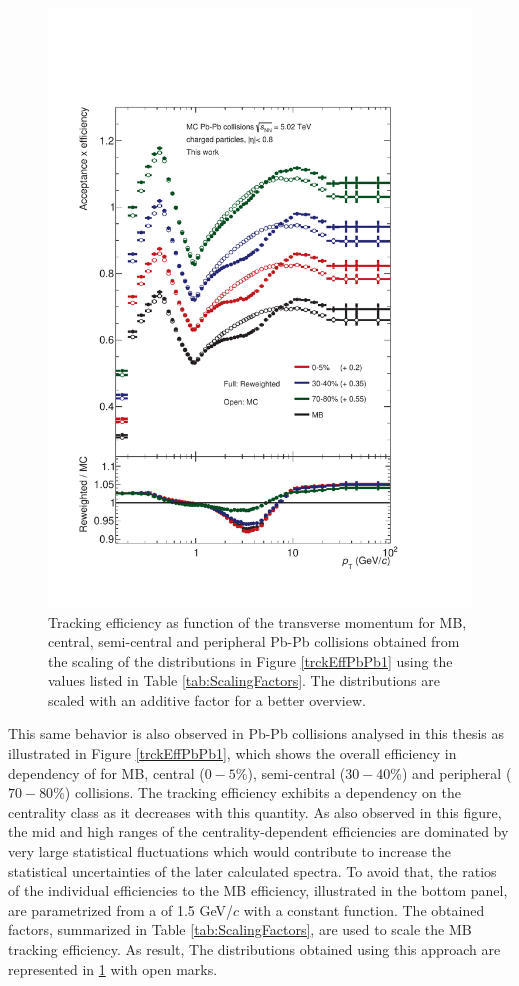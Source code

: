 \documentclass[12pt,a4paper]{report}
\begin{document}
\begin{figure}[tb!]
\centering
\includegraphics[width=12cm]{Plots/trckEffPbPb2.pdf}  
\caption{Tracking efficiency as function of the transverse momentum for MB, central, semi-central and peripheral Pb-Pb collisions obtained from the scaling of the distributions in Figure \ref{trckEffPbPb1} using the values listed in Table \ref{tab:ScalingFactors}. The distributions are scaled with an additive factor for a better overview.}
\label{trckEffPbPb2}
\end{figure}
\hspace{-0.3cm} This same behavior is also observed in Pb-Pb collisions analysed in this thesis as illustrated in Figure \ref{trckEffPbPb1}, which shows the overall efficiency in dependency of \pt for MB, central ($0-5$\%), semi-central ($30-40$\%) and peripheral ($70-80$\%) collisions. The tracking efficiency exhibits a dependency on the centrality class as it decreases with this quantity. As also observed in this figure, the mid and high \pt ranges of the centrality-dependent efficiencies are dominated by very large statistical fluctuations which would contribute to increase the statistical uncertainties of the later calculated \pt spectra. To avoid that, the ratios of the individual efficiencies to the MB efficiency, illustrated in the bottom panel, are parametrized from a \pt of 1.5 GeV/$c$ with a constant function. The obtained factors, summarized in Table \ref{tab:ScalingFactors}, are used to scale the MB tracking efficiency. As result,  The distributions obtained using this approach are represented in \ref{trckEffPbPb2} with open marks. 
\end{document}
